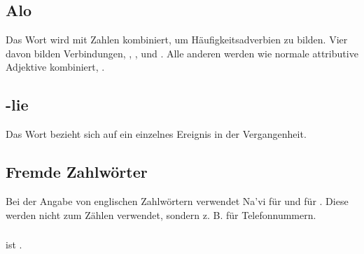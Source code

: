 \subsection{Alo} Das Wort   wird mit Zahlen kombiniert, um Häufigkeitsadverbien zu bilden. Vier davon bilden Verbindungen,  ,  ,   und  . Alle anderen werden wie normale attributive Adjektive kombiniert,  . 

\subsection{-lie} Das Wort  bezieht sich auf ein einzelnes Ereignis in der Vergangenheit. 

\subsection{Fremde Zahlwörter} Bei der Angabe von englischen Zahlwörtern verwendet Na'vi  für  und  für . Diese werden nicht zum Zählen verwendet, sondern z. B. für Telefonnummern. 

\subsubsection{}  ist . 
